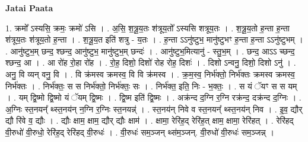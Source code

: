 \documentclass[17pt]{extarticle}
\begin{document}
\textbf{Jatai Paata} \newline

1. क्रमो᳚ ऽस्यसि॒ क्रमः॒ क्रमो॑ ऽसि । . अ॒सि॒ श॒त्रू॒य॒तः श॑त्रूय॒तो᳚ ऽस्यसि शत्रूय॒तः । . श॒त्रू॒य॒तो ह॒न्ता ह॒न्ता श॑त्रूय॒तः श॑त्रूय॒तो ह॒न्ता । . श॒त्रू॒य॒त इति॑ शत्रु - य॒तः । . ह॒न्ता ऽऽनु॑ष्टुभ॒ मानु॑ष्टुभꣳ ह॒न्ता ह॒न्ता ऽऽनु॑ष्टुभम् । . आनु॑ष्टुभ॒म् छन्द॒ श्छन्द॒ आनु॑ष्टुभ॒ मानु॑ष्टुभ॒म् छन्दः॑ । . आनु॑ष्टुभ॒मित्यानु॑ - स्तु॒भ॒म् । . छन्द॒ आऽऽ च्छन्द॒ श्छन्द॒ आ । . आ रो॑ह रो॒हा रो॑ह । . रो॒ह॒ दिशो॒ दिशो॑ रोह रोह॒ दिशः॑ । . दिशो ऽन्वनु॒ दिशो॒ दिशो ऽनु॑ । . अनु॒ वि व्यन् वनु॒ वि । . वि क्र॑मस्व क्रमस्व॒ वि वि क्र॑मस्व । . क्र॒म॒स्व॒ निर्भ॑क्तो॒ निर्भ॑क्तः क्रमस्व क्रमस्व॒ निर्भ॑क्तः । . निर्भ॑क्तः॒ स स निर्भ॑क्तो॒ निर्भ॑क्तः॒ सः । . निर्भ॑क्त॒ इति॒ निः - भ॒क्तः॒ । . स यं ॅयꣳ स स यम् । . यम् द्वि॒ष्मो द्वि॒ष्मो यं ॅयम् द्वि॒ष्मः । . द्वि॒ष्म इति॑ द्वि॒ष्मः । . अक्र॑न्द द॒ग्नि र॒ग्नि रक्र॑न्द॒ दक्र॑न्द द॒ग्निः । . अ॒ग्निः स्त॒नयन्᳚ थ्स्त॒नय॑न् न॒ग्नि र॒ग्निः स्त॒नयन्न्॑ । . स्त॒नय॑न् निवे व स्त॒नयन्᳚ थ्स्त॒नय॑न् निव । . इ॒व॒ द्यौर् द्यौ रि॑वे व॒ द्यौः । . द्यौः क्षाम॒ क्षाम॒ द्यौर् द्यौः क्षाम॑ । . क्षामा॒ रेरि॑ह॒द् रेरि॑ह॒त् क्षाम॒ क्षामा॒ रेरि॑हत् । . रेरि॑हद् वी॒रुधो॑ वी॒रुधो॒ रेरि॑ह॒द् रेरि॑हद् वी॒रुधः॑ । . वी॒रुधः॑ सम॒ञ्जन् थ्स॑म॒ञ्जन्. वी॒रुधो॑ वी॒रुधः॑ सम॒ञ्जन्न् । \newline
\end{document}
